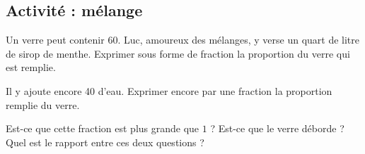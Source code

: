 
\subsection*{Activité : mélange}

    Un verre peut contenir \unit{60}{\centi\liter}. Luc, amoureux des mélanges, y verse un quart de litre de sirop de menthe. Exprimer sous forme de fraction la proportion du verre qui est remplie.

    Il y ajoute encore \unit{40}{\centi\liter} d'eau. Exprimer encore par une fraction la proportion remplie du verre.

    Est-ce que cette fraction est plus grande que \( 1\) ? Est-ce que le verre déborde ? Quel est le rapport entre ces deux questions ?

